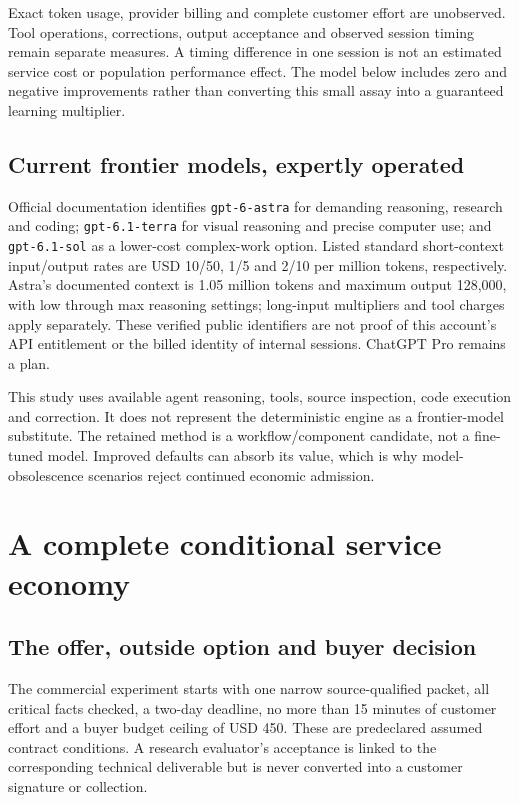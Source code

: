 

Exact token usage, provider billing and complete customer effort are unobserved. Tool operations, corrections, output acceptance and observed session timing remain separate measures. A timing difference in one session is not an estimated service cost or population performance effect. The model below includes zero and negative improvements rather than converting this small assay into a guaranteed learning multiplier.

\subsection{Current frontier models, expertly operated}

Official documentation identifies \texttt{gpt-6-astra} for demanding reasoning, research and coding; \texttt{gpt-6.1-terra} for visual reasoning and precise computer use; and \texttt{gpt-6.1-sol} as a lower-cost complex-work option. Listed standard short-context input/output rates are USD 10/50, 1/5 and 2/10 per million tokens, respectively. Astra's documented context is 1.05 million tokens and maximum output 128,000, with low through max reasoning settings; long-input multipliers and tool charges apply separately. These verified public identifiers are not proof of this account's API entitlement or the billed identity of internal sessions. ChatGPT Pro remains a plan.\citep{astra,terra,sol}

This study uses available agent reasoning, tools, source inspection, code execution and correction. It does not represent the deterministic engine as a frontier-model substitute. The retained method is a workflow/component candidate, not a fine-tuned model. Improved defaults can absorb its value, which is why model-obsolescence scenarios reject continued economic admission.

\section{A complete conditional service economy}

\subsection{The offer, outside option and buyer decision}

The commercial experiment starts with one narrow source-qualified packet, all critical facts checked, a two-day deadline, no more than 15 minutes of customer effort and a buyer budget ceiling of USD 450. These are predeclared assumed contract conditions. A research evaluator's acceptance is linked to the corresponding technical deliverable but is never converted into a customer signature or collection.

